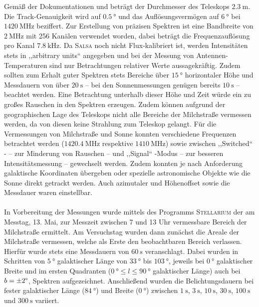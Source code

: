 Gemäß der Dokumentationen \cite{Usermanual} und \cite{AntennaResp} beträgt der Durchmesser des Teleskops $\SI{2.3}{\metre}$. Die Track-Genauigkeit wird auf $\SI{0.5}{\degree}$ und das Auflösungsvermögen auf $\SI{6}{\degree}$ bei $\SI{1420}{\mega \hertz}$ beziffert.
Zur Erstellung von präzisen Spektren ist eine Bandbreite von $\SI{2}{\mega \hertz}$ mit 256 Kanälen verwendet worden, dabei beträgt die Frequenzauflösung pro Kanal $\SI{7.8}{\kilo \hertz}$.
Da \textsc{Salsa} noch nicht Flux-kalibriert ist, werden Intensitäten stets in ,,arbitrary units`` angegeben und bei der Messung von Antennen-Temperaturen sind nur Betrachtungen relativer Werte aussagekräftig.
Zudem sollten zum Erhalt guter Spektren stets Bereiche über $\SI{15}{\degree}$ horizontaler Höhe und Messdauern von über $\SI{20}{\second}$ -- bei den Sonnenmessungen genügen bereits $\SI{10}{\second}$ -- beachtet werden. Eine Betrachtung unterhalb dieser Höhe und Zeit würde ein zu großes Rauschen in den Spektren erzeugen. Zudem können aufgrund der geographischen Lage des Teleskops nicht alle Bereiche der Milchstraße vermessen werden, da von diesen keine Strahlung zum Teleskop gelangt.
Für die Vermessungen von Milchstraße und Sonne konnten verschiedene Frequenzen betrachtet werden ($\SI{1420.4}{\mega \hertz}$ respektive $\SI{1410}{\mega \hertz}$) sowie zwischen  ,,Switched`` - -- zur Minderung von Rauschen --  und ,,Signal`` -Modus -- zur besseren Intensitätsmessung -- gewechselt werden.
Zudem konnten je nach Anforderung galaktische Koordinaten übergeben oder spezielle astronomische Objekte wie die Sonne direkt getrackt werden.
Auch azimutaler und Höhenoffset sowie die Messdauer waren einstellbar.\\ 
\\ 
In Vorbereitung der Messungen wurde mittels des Programms \textsc{Stellarium} der am Messtag, 13. Mai, zur Messzeit zwischen 7 und 13 Uhr vermessbare Bereich der Milchstraße ermittelt.
Am Versuchstag wurden dann zunächst die Areale der Milchstraße vermessen, welche als Erste den beobachtbaren Bereich verlassen.
Hierfür wurde stets eine Messdauern von $\SI{60}{\second}$ veranschlagt.
Dabei wurden in Schritten von $\SI{5}{\degree}$ galaktischer Länge von $\SI{33}{\degree}$ bis $\SI{103}{\degree}$, jeweils bei $\SI{0}{\degree}$ galaktischer Breite und im ersten Quadranten ($\SI{0}{\degree} \le l \le \SI{90}{\degree}$ galaktischer Länge) auch bei $b=\pm \si{2}{\degree}$, Spektren aufgezeichnet.
Anschließend wurden die Belichtungsdauern bei fester galaktischer Länge ($\SI{84}{\degree}$) und Breite ($\SI{0}{\degree}$) zwischen $\SI{1}{\second}$, $\SI{3}{\second}$, $\SI{10}{\second}$, $\SI{30}{\second}$, $\SI{100}{\second}$ und $\SI{300}{\second}$ variiert.
